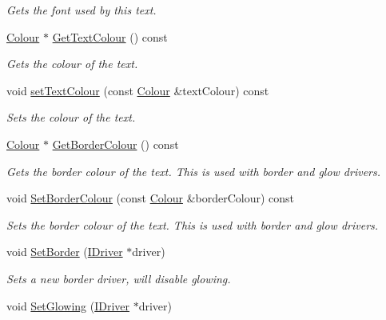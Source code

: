 \begin{DoxyCompactItemize}
\begin{DoxyCompactList}\small\item\em Gets the font used by this text. \end{DoxyCompactList}\item 
\hyperlink{class_flounder_1_1_colour}{Colour} $\ast$ \hyperlink{class_flounder_1_1_text_ad1632fa01c84e96fbd2c30ae0848ab87}{Get\+Text\+Colour} () const
\begin{DoxyCompactList}\small\item\em Gets the colour of the text. \end{DoxyCompactList}\item 
void \hyperlink{class_flounder_1_1_text_ac3bd171e773e46179ab55e95a8493995}{set\+Text\+Colour} (const \hyperlink{class_flounder_1_1_colour}{Colour} \&text\+Colour) const
\begin{DoxyCompactList}\small\item\em Sets the colour of the text. \end{DoxyCompactList}\item 
\hyperlink{class_flounder_1_1_colour}{Colour} $\ast$ \hyperlink{class_flounder_1_1_text_ac7347bc8128fd715bd1104ece9e983a6}{Get\+Border\+Colour} () const
\begin{DoxyCompactList}\small\item\em Gets the border colour of the text. This is used with border and glow drivers. \end{DoxyCompactList}\item 
void \hyperlink{class_flounder_1_1_text_af8312b2ea53e4a3c4d1a853915e48c98}{Set\+Border\+Colour} (const \hyperlink{class_flounder_1_1_colour}{Colour} \&border\+Colour) const
\begin{DoxyCompactList}\small\item\em Sets the border colour of the text. This is used with border and glow drivers. \end{DoxyCompactList}\item 
void \hyperlink{class_flounder_1_1_text_a506f5faba4da116887020cd4d79858ba}{Set\+Border} (\hyperlink{class_flounder_1_1_i_driver}{I\+Driver} $\ast$driver)
\begin{DoxyCompactList}\small\item\em Sets a new border driver, will disable glowing. \end{DoxyCompactList}\item 
void \hyperlink{class_flounder_1_1_text_ae0f1fef7f7af482213ad0c9ed9b4c00b}{Set\+Glowing} (\hyperlink{class_flounder_1_1_i_driver}{I\+Driver} $\ast$driver)

\end{DoxyCompactItemize}
